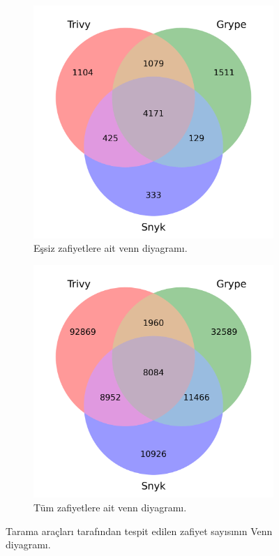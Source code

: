 \begin{figure}
	\centering
	\begin{subfigure}[Figure A]{\linewidth/2}
		\includegraphics[width=1\linewidth]{images/s1/vulCountsVennUniq.png}
		\caption{Eşsiz zafiyetlere ait venn diyagramı.}\label{fig:vulCountsVennUniq}
	\end{subfigure}%
	\begin{subfigure}[Figure A]{\linewidth/2}
		\includegraphics[width=1\linewidth]{images/s1/vulCountsVenn.png}
		\caption{Tüm zafiyetlere ait venn diyagramı.}\label{fig:vulCountsVenn}
	\end{subfigure}

	\caption{Tarama araçları tarafından tespit edilen zafiyet sayısının Venn diyagramı.}\label{fig:fig2}
\end{figure}

